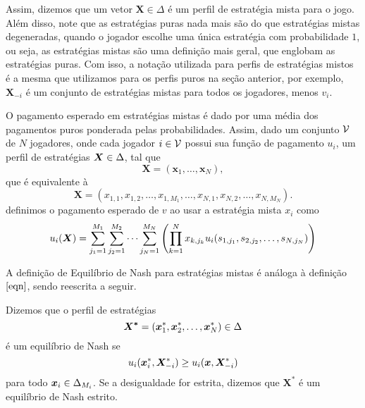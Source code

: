 Assim, dizemos que um vetor $\boldsymbol{X}\in\Delta$ é um perfil de estratégia mista para o jogo. Além disso, note que as estratégias puras nada mais são do que estratégias mistas degeneradas, quando o jogador escolhe uma única estratégia com probabilidade $1$, ou seja, as estratégias mistas são uma definição mais geral, que englobam as estratégias puras. Com isso, a notação utilizada para perfis de estratégias mistos é a mesma que utilizamos para os perfis puros na seção anterior, por exemplo, $\boldsymbol{X}_{-i}$ é um conjunto de estratégias mistas para todos os jogadores, menos $v_i$.

O pagamento esperado em estratégias mistas é dado por uma média dos pagamentos puros ponderada pelas probabilidades. Assim, dado um conjunto $\mathcal{V}$ de $N$ jogadores, onde cada jogador $i\in\mathcal{V}$ possui sua função de pagamento $u_i$, um perfil de estratégias $\boldsymbol{X}\in\Delta$, tal que
\begin{equation*}
    \boldsymbol{X}=(\boldsymbol{x}_1,\dots,\boldsymbol{x}_N),
\end{equation*}
que é equivalente à
\begin{equation*}
    \boldsymbol{X}=(x_{1,1},x_{1,2},\dots,x_{1,M_1},\dots,x_{N,1},x_{N,2},\dots,x_{N,M_N}).
\end{equation*}
definimos o pagamento esperado de $v$ ao usar a estratégia mista $x_i$ como
\begin{equation}
    \label{defPgtoClassico}
    u_i(\boldsymbol{X})=\sum_{j_1=1}^{M_1}\sum_{j_2=1}^{M_2}\dots\sum_{j_N=1}^{M_N}
                    \left( \prod_{k=1}^N x_{k,j_k}u_i(s_{1,j_1},s_{2,j_2},\dots,s_{N,j_N})\right)
\end{equation}

A definição de Equilíbrio de Nash para estratégias mistas é análoga à definição $\eqref{eqn}$, sendo reescrita a seguir.

\begin{definition}
    \label{DefEqNashClassico}
    Dizemos que o perfil de estratégias
    \begin{equation*}
        \boldsymbol{X^*}=(\boldsymbol{x}^*_{1},\boldsymbol{x}^*_{2},\dots,\boldsymbol{x}^*_{N})\in\Delta
    \end{equation*}
    é um equilíbrio de Nash se
    \begin{equation*}
        u_i(\boldsymbol{x}^*_i,\boldsymbol{X}^*_{-i})\geq u_i(\boldsymbol{x},\boldsymbol{X}^*_{-i})
    \end{equation*}
    para todo $\boldsymbol{x}_i\in\Delta_{M_i}$. Se a desigualdade for estrita, dizemos que $\boldsymbol{X^*}$ é um equilíbrio de Nash estrito.
\end{definition}

